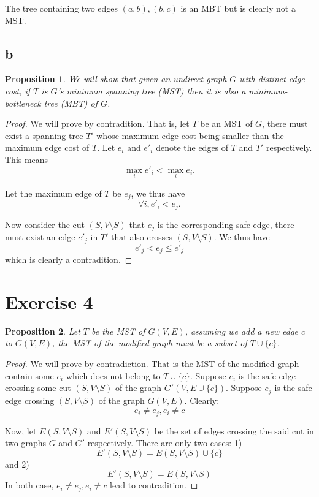 \documentclass[a4paper,10pt,twoside]{article}
\newtheorem{proof}{Proof}
\newtheorem{proposition}{Proposition}
\begin{document}
\begin{figure}[h]
	\centering
{}
	\label{fig:figure1}
\end{figure}
The tree containing two edges $(a, b), (b, c)$ is an MBT but is clearly
not a MST.

\subsection*{b}
\begin{proposition}
We will show that given an undirect graph $G$ with distinct edge
cost, if $T$ is $G$'s minimum spanning
tree (MST) then it is also a minimum-bottleneck tree (MBT) of $G$.	
\end{proposition}
\begin{proof}
	We will prove by contradition. That is, let $T$ be an MST of $G$,
	there must exist a spanning tree $T'$ whose maximum edge cost
	being smaller than the maximum edge cost of $T$.
	Let $e_i$ and $e'_i$ denote the edges of $T$ and $T'$ respectively.
	This means
	\[
		\max_i{e'_i} < \max_i{e_i}.
	\]

	Let the maximum edge of $T$ be $e_j$, we thus have
	\[
		\forall i, e'_i < e_j.
	\]

	Now consider the cut $(S, V\setminus S)$ that $e_j$ is the corresponding
	safe edge, there must exist an edge $e'_j$ in $T'$ that also crosses $(S, V\setminus S)$.
	We thus have
	\[
		e'_j < e_j \leq e'_j
	\]
	which is clearly a contradition.
\end{proof}
\section*{Exercise 4}
\begin{proposition}
\label{prop:4-1}
	Let $T$ be the MST of $G(V, E)$, assuming we add a new edge $c$ to $G(V, E)$, the
	MST of the modified graph must be a subset of $T\cup \{c\}$.
\end{proposition}
\begin{proof}
	We will prove by contradiction. That is the MST of the modified graph contain some $e_i$ which
	does not belong to $T \cup \{c\}$. Suppose $e_i$ is the safe edge crossing some cut 
	$(S, V\setminus S)$ of the graph $G'(V, E \cup \{c\})$. Suppose $e_j$ is the safe edge
	crossing $(S, V\setminus S)$ of the graph $G(V, E)$. Clearly:
	\[
		e_i \neq e_j, e_i \neq c
	\]

	Now, let $E(S, V\setminus S)$ and $E'(S, V\setminus S)$ be the set of edges crossing
	the said cut in two graphs $G$ and $G'$ respectively. There are only two cases: 
	1) 
	$$E'(S, V\setminus S)=E(S, V\setminus S) \cup \{c\}$$ and 2) 
	$$E'(S, V\setminus S)=E(S, V\setminus S)$$
	In both case, $e_i \neq e_j, e_i \neq c$
	lead to contradition.

\end{proof}
\end{document}
